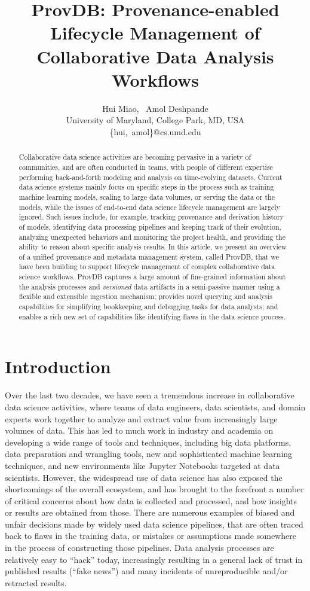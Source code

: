 \documentclass[11pt]{article}
\title{ProvDB: Provenance-enabled Lifecycle Management of Collaborative Data Analysis Workflows}
\author{
Hui Miao,~ Amol Deshpande\\
       {University of Maryland, College Park, MD, USA}\\
       {{\large{\{}}hui,~amol{\large{\}}}@cs.umd.edu} 
}
\newcommand{\provdb}{{\sc ProvDB}\xspace}
\begin{document}
\maketitle

\begin{abstract}
Collaborative data science activities are becoming pervasive in a variety of communities, and are often conducted in teams, with people of different expertise performing back-and-forth modeling and analysis on time-evolving datasets. Current data science systems mainly focus on specific steps in the process such as training machine learning models, scaling to large data volumes, or serving the data or the models, while the issues of end-to-end data science lifecycle management are largely ignored. Such issues include, for example, tracking provenance and derivation history of models, identifying data processing pipelines and keeping track of their evolution, analyzing unexpected behaviors and monitoring the project health, and providing the ability to reason about specific analysis results. 
In this article, we present an overview of a unified provenance and metadata management system, called \provdb, that we have been building to support lifecycle management of complex collaborative data science workflows. 
\provdb captures a large amount of fine-grained information about the analysis processes and {\em versioned} data artifacts in a semi-passive manner using a flexible
and extensible ingestion mechanism; provides novel querying and analysis capabilities for simplifying bookkeeping and debugging tasks for data analysts; and enables a rich new set of capabilities like identifying flaws in the data science process. 
\end{abstract}




\section{Introduction}
Over the last two decades, we have seen a tremendous increase in collaborative
data science activities, where teams of data engineers, data scientists, and
domain experts work together to analyze and extract value from increasingly
large volumes of data. This has led to much work in industry and academia on
developing a wide range of tools and techniques, including  big data platforms,
data preparation and wrangling tools, new and sophisticated machine learning
techniques, and new environments like Jupyter Notebooks targeted at data
scientists. However, the widespread use of data science has also exposed the
shortcomings of the overall ecosystem, and has brought to the forefront a number
of critical concerns about how data is collected and processed, and how insights
or results are obtained from those. There are numerous examples of biased and
unfair decisions made by widely used data science pipelines, that are often
traced back to flaws in the training data, or mistakes or assumptions made
somewhere in the process of constructing those pipelines. Data analysis
processes are relatively easy to ``hack'' today, increasingly resulting in a
general lack of trust in published results (``fake news'') and many incidents of
unreproducible and/or retracted results.
\newpage
\end{document}
